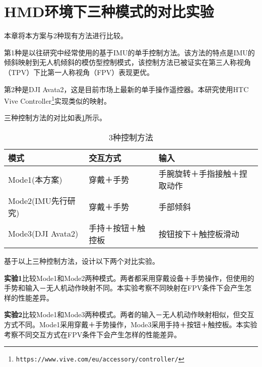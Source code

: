 \ifx\allfiles\undefined


\else
\fi

\section{HMD环境下三种模式的对比实验}
 
本章将本方案与2种现有方法进行比较。

第1种是以往研究中经常使用的基于IMU的单手控制方法\cite{kim2022intuitive,shin2019hand,budiyanto2021navigation,lee2023wearable}。该方法的特点是IMU的倾斜映射到无人机倾斜的模仿型控制模式，该控制方法已被证实在第三人称视角（TPV）下比第一人称视角（FPV）表现更优\cite{kim2022intuitive}。

第2种是DJI Avata2，这是目前市场上最新的单手操作遥控器。本研究使用HTC Vive Controller\footnote{\texttt{https://www.vive.com/eu/accessory/controller/}}实现类似的映射。

三种控制方法的对比如表\ref{tab:three-models}所示。

\begin{table}[bhtp]
    \centering
    \caption{3种控制方法}
    \label{tab:three-models}
    \begin{tabular}{llp{3.5cm}}
        \hline
        模式          & 交互方式              & 输入                  \\ \hline
        Mode1(本方案)      & 穿戴＋手势             & 手腕旋转＋手指接触＋捏取动作    \\ \hline
        Mode2(IMU先行研究)   & 穿戴＋手势             & 手部倾斜               \\ \hline
        Mode3(DJI Avata2) & 手持＋按钮＋触控板        & 按钮按下＋触控板滑动        \\ \hline
    \end{tabular}
\end{table}

基于以上三种控制方法，设计以下两个对比实验。

\textbf{实验1}比较Mode1和Mode2两种模式。两者都采用穿戴设备＋手势操作，但使用的手势和输入－无人机动作映射不同。本实验考察不同映射在FPV条件下会产生怎样的性能差异。

\textbf{实验2}比较Mode1和Mode3两种模式。两者的输入－无人机动作映射相似，但交互方式不同。Mode1采用穿戴＋手势操作，Mode3采用手持＋按钮＋触控板。本实验考察不同交互方式在FPV条件下会产生怎样的性能差异。

